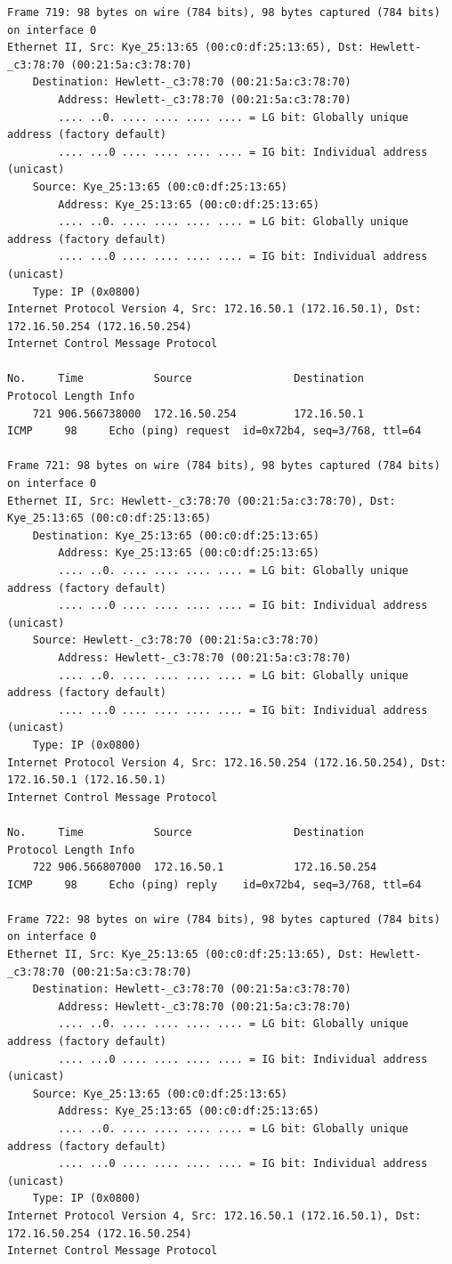 \documentclass[a4paper,11pt]{article}
\begin{document}
\begin{lstlisting}
Frame 719: 98 bytes on wire (784 bits), 98 bytes captured (784 bits) on interface 0
Ethernet II, Src: Kye_25:13:65 (00:c0:df:25:13:65), Dst: Hewlett-_c3:78:70 (00:21:5a:c3:78:70)
    Destination: Hewlett-_c3:78:70 (00:21:5a:c3:78:70)
        Address: Hewlett-_c3:78:70 (00:21:5a:c3:78:70)
        .... ..0. .... .... .... .... = LG bit: Globally unique address (factory default)
        .... ...0 .... .... .... .... = IG bit: Individual address (unicast)
    Source: Kye_25:13:65 (00:c0:df:25:13:65)
        Address: Kye_25:13:65 (00:c0:df:25:13:65)
        .... ..0. .... .... .... .... = LG bit: Globally unique address (factory default)
        .... ...0 .... .... .... .... = IG bit: Individual address (unicast)
    Type: IP (0x0800)
Internet Protocol Version 4, Src: 172.16.50.1 (172.16.50.1), Dst: 172.16.50.254 (172.16.50.254)
Internet Control Message Protocol

No.     Time           Source                Destination           Protocol Length Info
    721 906.566738000  172.16.50.254         172.16.50.1           ICMP     98     Echo (ping) request  id=0x72b4, seq=3/768, ttl=64

Frame 721: 98 bytes on wire (784 bits), 98 bytes captured (784 bits) on interface 0
Ethernet II, Src: Hewlett-_c3:78:70 (00:21:5a:c3:78:70), Dst: Kye_25:13:65 (00:c0:df:25:13:65)
    Destination: Kye_25:13:65 (00:c0:df:25:13:65)
        Address: Kye_25:13:65 (00:c0:df:25:13:65)
        .... ..0. .... .... .... .... = LG bit: Globally unique address (factory default)
        .... ...0 .... .... .... .... = IG bit: Individual address (unicast)
    Source: Hewlett-_c3:78:70 (00:21:5a:c3:78:70)
        Address: Hewlett-_c3:78:70 (00:21:5a:c3:78:70)
        .... ..0. .... .... .... .... = LG bit: Globally unique address (factory default)
        .... ...0 .... .... .... .... = IG bit: Individual address (unicast)
    Type: IP (0x0800)
Internet Protocol Version 4, Src: 172.16.50.254 (172.16.50.254), Dst: 172.16.50.1 (172.16.50.1)
Internet Control Message Protocol

No.     Time           Source                Destination           Protocol Length Info
    722 906.566807000  172.16.50.1           172.16.50.254         ICMP     98     Echo (ping) reply    id=0x72b4, seq=3/768, ttl=64

Frame 722: 98 bytes on wire (784 bits), 98 bytes captured (784 bits) on interface 0
Ethernet II, Src: Kye_25:13:65 (00:c0:df:25:13:65), Dst: Hewlett-_c3:78:70 (00:21:5a:c3:78:70)
    Destination: Hewlett-_c3:78:70 (00:21:5a:c3:78:70)
        Address: Hewlett-_c3:78:70 (00:21:5a:c3:78:70)
        .... ..0. .... .... .... .... = LG bit: Globally unique address (factory default)
        .... ...0 .... .... .... .... = IG bit: Individual address (unicast)
    Source: Kye_25:13:65 (00:c0:df:25:13:65)
        Address: Kye_25:13:65 (00:c0:df:25:13:65)
        .... ..0. .... .... .... .... = LG bit: Globally unique address (factory default)
        .... ...0 .... .... .... .... = IG bit: Individual address (unicast)
    Type: IP (0x0800)
Internet Protocol Version 4, Src: 172.16.50.1 (172.16.50.1), Dst: 172.16.50.254 (172.16.50.254)
Internet Control Message Protocol


\end{lstlisting}
\end{document}
